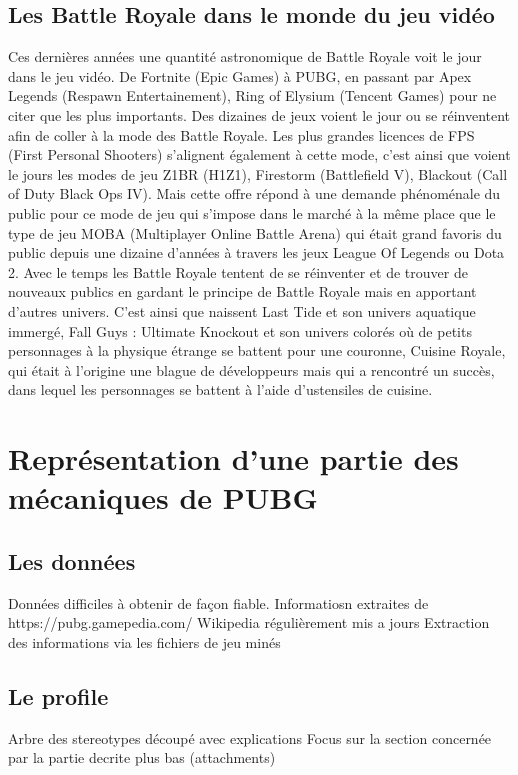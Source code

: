 \subsection{Les Battle Royale dans le monde du jeu vidéo}
Ces dernières années une quantité astronomique de Battle Royale voit le jour dans le jeu vidéo. De Fortnite (Epic Games) à PUBG, en passant par Apex Legends (Respawn Entertainement), Ring of Elysium (Tencent Games) pour ne citer que les plus importants. Des dizaines de jeux voient le jour ou se réinventent afin de coller à la mode des Battle Royale. Les plus grandes licences de FPS (First Personal Shooters) s'alignent également à cette mode, c'est ainsi que voient le jours les modes de jeu Z1BR (H1Z1), Firestorm (Battlefield V), Blackout (Call of Duty Black Ops IV). Mais cette offre répond à une demande phénoménale du public pour ce mode de jeu qui s'impose dans le marché à la même place que le type de jeu MOBA (Multiplayer Online Battle Arena) qui était grand favoris du public depuis une dizaine d'années à travers les jeux League Of Legends ou Dota 2. Avec le temps les Battle Royale tentent de se réinventer et de trouver de nouveaux publics en gardant le principe de Battle Royale mais en apportant d'autres univers. C'est ainsi que naissent Last Tide et son univers aquatique immergé, Fall Guys : Ultimate Knockout et son univers colorés où de petits personnages à la physique étrange se battent pour une couronne, Cuisine Royale, qui était à l'origine une blague de développeurs mais qui a rencontré un succès, dans lequel les personnages se battent à l'aide d'ustensiles de cuisine.

\section{Représentation d'une partie des mécaniques de PUBG}
\subsection{Les données}
Données difficiles à obtenir de façon fiable.
Informatiosn extraites de https://pubg.gamepedia.com/
Wikipedia régulièrement mis a jours
Extraction des informations via les fichiers de jeu minés


\subsection{Le profile}
Arbre des stereotypes découpé avec explications
Focus sur la section concernée par la partie decrite plus bas (attachments)

